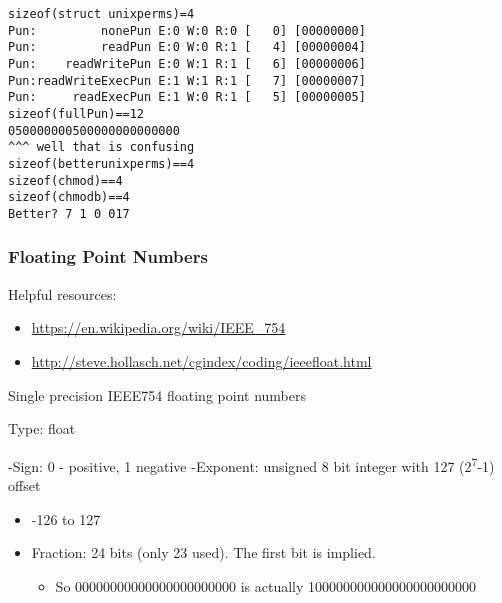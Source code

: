\documentclass[11pt]{article}
\begin{document}
\begin{enumerate}
\begin{verbatim}
\end{verbatim}

\begin{verbatim}
sizeof(struct unixperms)=4
Pun:         nonePun E:0 W:0 R:0 [   0] [00000000]
Pun:         readPun E:0 W:0 R:1 [   4] [00000004]
Pun:    readWritePun E:0 W:1 R:1 [   6] [00000006]
Pun:readWriteExecPun E:1 W:1 R:1 [   7] [00000007]
Pun:     readExecPun E:1 W:0 R:1 [   5] [00000005]
sizeof(fullPun)==12
050000000500000000000000
^^^ well that is confusing
sizeof(betterunixperms)==4
sizeof(chmod)==4
sizeof(chmodb)==4
Better? 7 1 0 017
\end{verbatim}
\end{enumerate}

\subsubsection{Floating Point Numbers}
\label{sec:org42de4b6}

Helpful resources:
\begin{itemize}
\item \url{https://en.wikipedia.org/wiki/IEEE\_754}
\item \url{http://steve.hollasch.net/cgindex/coding/ieeefloat.html}
\end{itemize}
Single precision IEEE754 floating point numbers

Type: float

-Sign: 0 - positive, 1 negative
-Exponent: unsigned 8 bit integer with 127 (2\textsuperscript{7}-1) offset
\begin{itemize}
\item -126 to 127
\end{itemize}
\begin{itemize}
\item Fraction: 24 bits (only 23 used). The first bit is implied. 
\begin{itemize}
\item So 00000000000000000000000 is actually 100000000000000000000000
\end{itemize}
\end{itemize}
\end{document}
